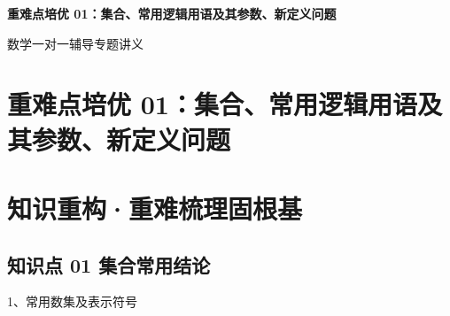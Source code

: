 \documentclass[11pt,a4paper]{ctexart}
\begin{document}
\begin{center}
  \vspace*{0.5cm}
  {\Huge\bfseries 重难点培优 01：集合、常用逻辑用语及其参数、新定义问题}\par
  \vspace{0.5cm}
  {\large 数学一对一辅导专题讲义}\par
  \vspace{0.8cm}
\end{center}

\section{重难点培优
01：集合、常用逻辑用语及其参数、新定义问题}\label{ux91cdux96beux70b9ux57f9ux4f18-01ux96c6ux5408ux5e38ux7528ux903bux8f91ux7528ux8bedux53caux5176ux53c2ux6570ux65b0ux5b9aux4e49ux95eeux9898}

\section{知识重构·重难梳理固根基}\label{ux77e5ux8bc6ux91cdux6784ux91cdux96beux68b3ux7406ux56faux6839ux57fa}

\subsection{知识点 01
集合常用结论}\label{ux77e5ux8bc6ux70b9-01-ux96c6ux5408ux5e38ux7528ux7ed3ux8bba}

1、常用数集及表示符号
\end{document}
